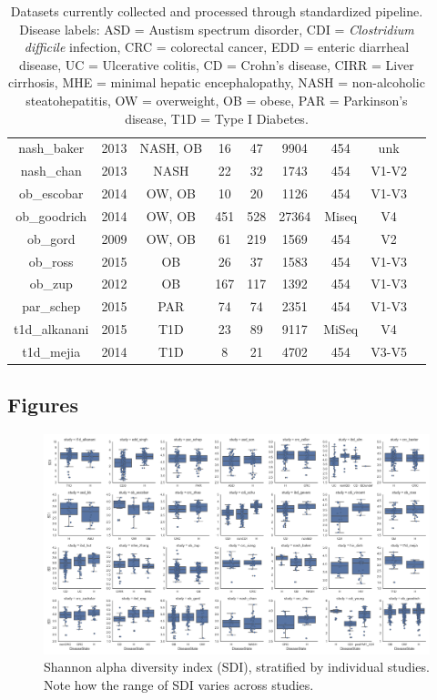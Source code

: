 \documentclass[12pt]{article}
\begin{document}
{\begin{table}
{\begin{tabular}{|c|c|c|c|c|c|c|c|c|}
	nash\_baker & 2013 & NASH, OB & 16 & 47 & 9904 & 454 & unk & \cite{nash-baker}\\ 
	nash\_chan & 2013 & NASH & 22 & 32 & 1743 & 454 & V1-V2 & \cite{nash-chan}\\ 
	ob\_escobar & 2014 & OW, OB & 10 & 20 & 1126 & 454 & V1-V3 & \cite{ob-escobar}\\ 
	ob\_goodrich & 2014 & OW, OB & 451 & 528 & 27364 & Miseq & V4 & \cite{ob-goodrich}\\ 
	ob\_gord & 2009 & OW, OB & 61 & 219 & 1569 & 454 & V2 & \cite{ob-gordon}\\ 
	ob\_ross & 2015 & OB & 26 & 37 & 1583 & 454 & V1-V3 & \cite{ob-ross}\\ 
	ob\_zup & 2012 & OB & 167 & 117 & 1392 & 454 & V1-V3 & \cite{ob-zupancic}\\ 
	par\_schep & 2015 & PAR & 74 & 74 & 2351 & 454 & V1-V3 & \cite{par-schep}\\ 
	t1d\_alkanani & 2015 & T1D & 23 & 89 & 9117 & MiSeq & V4 & \cite{t1d_alkanani}\\ 
	t1d\_mejia & 2014 & T1D & 8 & 21 & 4702 & 454 & V3-V5 & \cite{t1d_mejia}\\ 	
	\hline
\end{tabular}}
\caption{Datasets currently collected and processed through standardized pipeline. Disease labels: ASD = Austism spectrum disorder, CDI = \textit{Clostridium difficile} infection, CRC = colorectal cancer, EDD = enteric diarrheal disease, UC = Ulcerative colitis, CD = Crohn's disease, CIRR = Liver cirrhosis, MHE =  minimal hepatic encephalopathy, NASH = non-alcoholic steatohepatitis, OW = overweight, OB = obese, PAR = Parkinson's disease, T1D = Type I Diabetes. }\label{tab:datasets}
\end{table}
}

\subsection{Figures}\label{sec:appendix_figures}

\begin{figure}
\begin{center}
	\includegraphics[scale=0.3]{alpha_diversity_by_study}
	\caption{Shannon alpha diversity index (SDI), stratified by individual studies. Note how the range of SDI varies across studies.}
	\label{fig:alpha_all}
\end{center}
\end{figure}
\end{document}
